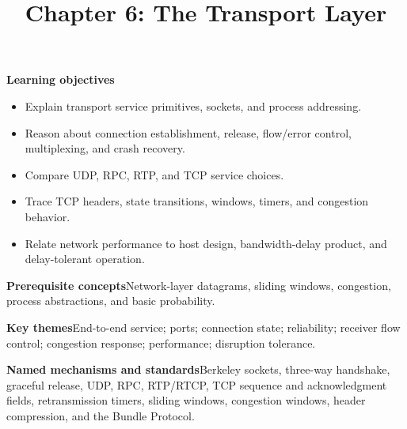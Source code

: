 \documentclass[10pt,letterpaper]{article}
\title{Chapter 6: The Transport Layer}
\author{}
\date{}
\begin{document}
\maketitle
{}
\begin{overviewbox}
\textbf{Learning objectives}\begin{itemize}
  \item Explain transport service primitives, sockets, and process addressing.
  \item Reason about connection establishment, release, flow/error control, multiplexing, and crash recovery.
  \item Compare UDP, RPC, RTP, and TCP service choices.
  \item Trace TCP headers, state transitions, windows, timers, and congestion behavior.
  \item Relate network performance to host design, bandwidth-delay product, and delay-tolerant operation.
\end{itemize}
\textbf{Prerequisite concepts}\quad Network-layer datagrams, sliding windows, congestion, process abstractions, and basic probability.\par
\textbf{Key themes}\quad End-to-end service; ports; connection state; reliability; receiver flow control; congestion response; performance; disruption tolerance.\par
\textbf{Named mechanisms and standards}\quad Berkeley sockets, three-way handshake, graceful release, UDP, RPC, RTP/RTCP, TCP sequence and acknowledgment fields, retransmission timers, sliding windows, congestion windows, header compression, and the Bundle Protocol.
\end{overviewbox}

\end{document}
